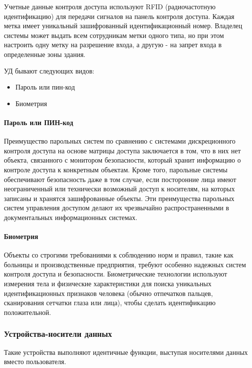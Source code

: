 Учетные данные контроля доступа используют RFID (радиочастотную идентификацию) для передачи сигналов на панель контроля доступа. Каждая метка имеет уникальный зашифрованный идентификационный номер. Владелец системы может выдать всем сотрудникам метки одного типа, но при этом настроить одну метку на разрешение входа, а другую - на запрет входа в определенные зоны здания.

УД бывают следующих видов:

\begin{itemize}
	\item Пароль или пин-код
	\item Биометрия
\end{itemize}


\paragraph{Пароль или ПИН-код}

Преимущество парольных систем по сравнению с системами дискреционного контроля доступа на основе матрицы доступа заключается в том, что в них нет объекта, связанного с монитором безопасности, который хранит информацию о контроле доступа к конкретным объектам. Кроме того, парольные системы обеспечивают безопасность даже в том случае, если посторонние лица имеют неограниченный или технически возможный доступ к носителям, на которых записаны и хранятся зашифрованные объекты. Эти преимущества парольных систем управления доступом делают их чрезвычайно распространенными в документальных информационных системах.

\paragraph{Биометрия}

Объекты со строгими требованиями к соблюдению норм и правил, такие как больницы и производственные предприятия, требуют особенно надежных систем контроля доступа и безопасности. Биометрические технологии используют измерения тела и физические характеристики для поиска уникальных идентификационных признаков человека (обычно отпечатков пальцев, сканирования сетчатки глаза или лица), чтобы сделать идентификацию положительной. 

\subsubsection{Устройства-носители данных}

Такие устройства выполняют идентичные функции, выступая носителями данных вместо пользователя.

